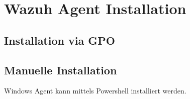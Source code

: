 \chapter{Wazuh Agent Installation}

\section{Installation via GPO}


%
%
%
%
%











\section{Manuelle Installation}

Windows Agent kann mittels Powershell installiert werden.


